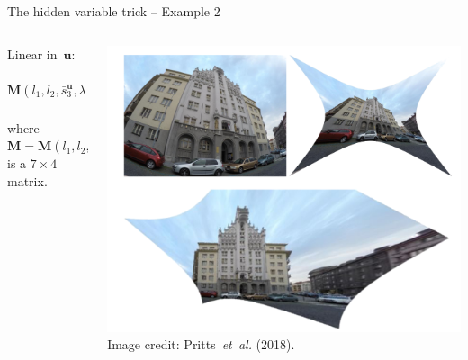 \documentclass[aspectratio=169]{beamer}
\makeatletter
\newcommand{\etal}{\emph{et~al.}}
\newcommand{\mat}[1]{\bm{#1}}
\DeclareRobustCommand\etal{\emph{et~al}\@ifnextchar.{}{.\@}}
\makeatother
\begin{document}
\begin{frame}[t]{The hidden variable trick -- Example 2}
\begin{columns}
    \begin{column}{0.5\textwidth}
        \begin{minipage}[t][\textheight][t]{\textwidth}
        \hiddenvariableTwoeHeight
        Linear in~$\mat{u}$:
        \begin{equation*}
        \mat{M}(l_1,l_2,\bar{s}_3^{\mat{u}},\lambda)\begin{bmatrix} u_1 \\ u_2 \\ u_3 \\1\end{bmatrix} = 0
        \end{equation*}
        where $\mat{M} = \mat{M}(l_1,l_2,\bar{s}_3^{\mat{u}},\lambda)$ is a $7\times 4$ matrix.
        \end{minipage}
    \end{column}%
    \begin{column}{0.5\textwidth}
        \centering
        \includegraphics[width=\linewidth]{images/conjugate_trans.png}
        {\scriptsize Image credit: Pritts~\etal{} (2018).}
    \end{column}
\end{columns}
\end{frame}
\end{document}
